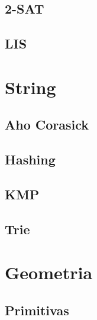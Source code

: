 \documentclass[12pt, a4paper, twoside]{article}
\begin{document}
\subsection{2-SAT}


\newpage

\subsection{LIS}


\newpage

%
%

\section{String}

\subsection{Aho Corasick}


\newpage

\subsection{Hashing}


\newpage

\subsection{KMP}


\newpage

\subsection{Trie}


\newpage

%
%

\section{Geometria}

\subsection{Primitivas}

\end{document}
